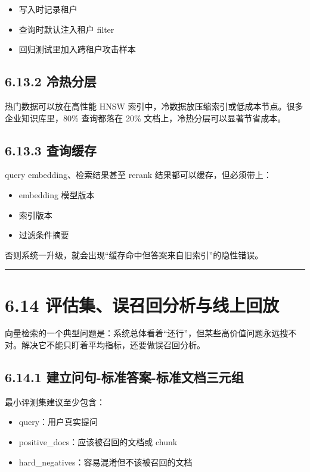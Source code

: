 \begin{itemize}[leftmargin=2em]
\item 写入时记录租户
\item 查询时默认注入租户 filter
\item 回归测试里加入跨租户攻击样本
\end{itemize}

\subsection{6.13.2 冷热分层}

热门数据可以放在高性能 HNSW 索引中，冷数据放压缩索引或低成本节点。很多企业知识库里，80\% 查询都落在 20\% 文档上，冷热分层可以显著节省成本。


\subsection{6.13.3 查询缓存}

query embedding、检索结果甚至 rerank 结果都可以缓存，但必须带上：


\begin{itemize}[leftmargin=2em]
\item embedding 模型版本
\item 索引版本
\item 过滤条件摘要
\end{itemize}

否则系统一升级，就会出现``缓存命中但答案来自旧索引''的隐性错误。


\bigskip\hrule\bigskip

\section{6.14 评估集、误召回分析与线上回放}

向量检索的一个典型问题是：系统总体看着``还行''，但某些高价值问题永远搜不对。解决它不能只盯着平均指标，还要做误召回分析。


\subsection{6.14.1 建立问句-标准答案-标准文档三元组}

最小评测集建议至少包含：


\begin{itemize}[leftmargin=2em]
\item query：用户真实提问
\item positive\_docs：应该被召回的文档或 chunk
\item hard\_negatives：容易混淆但不该被召回的文档
\end{itemize}

